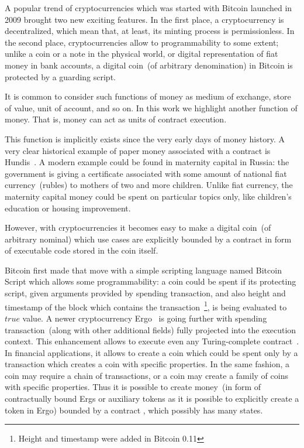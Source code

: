 \documentclass[]{llncs}   %
\begin{document}
A popular trend of cryptocurrencies which was started with Bitcoin launched in 2009 brought two new exciting features.
In the first place, a cryptocurrency is decentralized, which mean that, at least, its minting process is permissionless.
In the second place, cryptocurrencies allow to programmability to some extent; unlike a coin or a note in the physical
world, or digital representation of fiat money in bank accounts, a digital coin~(of arbitrary denomination) in Bitcoin
is protected by a guarding script.

It is common to consider such functions of money as medium of exchange, store of value, unit of account, and so on.
In this work we highlight another function of money. That is, money can act as units of contract execution.

This function is implicitly exists since the very early days of money history. A very clear historical example of paper money associated with a contract is Hundis~\cite{martin2009hundi}. A modern example could be found in
maternity capital in Russia: the government is giving a certificate associated with some amount of national fiat currency~(rubles)
to mothers of two and more children. Unlike fiat currency, the maternity capital money could be spent on particular
topics only, like children's education or housing improvement.

However, with cryptocurrencies it becomes easy to make a digital coin~(of arbitrary nominal) which use cases are
explicitly bounded by a contract in form of executable code stored in the coin itself.

Bitcoin first made that move with a simple
scripting language named Bitcoin Script which allows some programmability: a coin could be spent if its protecting script,
given arguments provided by spending transaction, and also height and timestamp of the block which contains the
transaction~\footnote{Height and timestamp were added in Bitcoin 0.11},
is being evaluated to $true$ value. A newer cryptocurrency Ergo~\cite{ergowp} is going further with spending transaction~(along with other additional
fields) fully projected into the execution context. This enhancement allows to execute even any Turing-complete
contract~\cite{chepurnoy2018self}. In financial applications, it allows to create a coin which could be spent only by
a transaction which creates a coin with specific properties. In the same fashion, a coin may require a chain of
transactions, or a coin may create a family of coins with specific properties. Thus it is possible to create money~(in
form of contractually bound Ergs or auxiliary tokens as it is possible to explicitly create a token in Ergo) bounded by a contract 
, which possibly has many states. 
\end{document}
